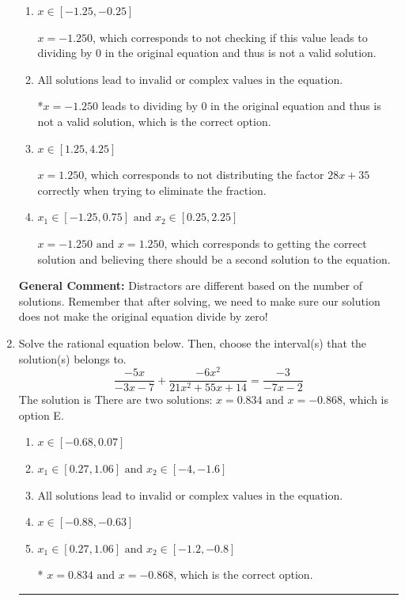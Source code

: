 \documentclass{extbook}[14pt]
\newcommand{\litem}[1]{\item #1

\rule{\textwidth}{0.4pt}}
\begin{document}
\begin{enumerate}
{\begin{enumerate}[label=\Alph*.]
$x = -1.250 \text{ and } x = -1.250$, which corresponds to getting the correct solution and believing there should be a second solution to the equation.
\item \( x \in [-1.25,-0.25] \)

$x = -1.250$, which corresponds to not checking if this value leads to dividing by 0 in the original equation and thus is not a valid solution.
\item \( \text{All solutions lead to invalid or complex values in the equation.} \)

*$x = -1.250$ leads to dividing by 0 in the original equation and thus is not a valid solution, which is the correct option.
\item \( x \in [1.25,4.25] \)

$x = 1.250$, which corresponds to not distributing the factor $28x + 35$ correctly when trying to eliminate the fraction.
\item \( x_1 \in [-1.25, 0.75] \text{ and } x_2 \in [0.25,2.25] \)

$x = -1.250 \text{ and } x = 1.250$, which corresponds to getting the correct solution and believing there should be a second solution to the equation.
\end{enumerate}

\textbf{General Comment:} Distractors are different based on the number of solutions. Remember that after solving, we need to make sure our solution does not make the original equation divide by zero!
}
\litem{
Solve the rational equation below. Then, choose the interval(s) that the solution(s) belongs to.
\[ \frac{-5x}{-3x -7} + \frac{-6x^{2}}{21x^{2} +55 x + 14} = \frac{-3}{-7x -2} \]The solution is \( \text{There are two solutions: } x = 0.834 \text{ and } x = -0.868 \), which is option E.\begin{enumerate}[label=\Alph*.]
\item \( x \in [-0.68,0.07] \)


\item \( x_1 \in [0.27, 1.06] \text{ and } x_2 \in [-4,-1.6] \)


\item \( \text{All solutions lead to invalid or complex values in the equation.} \)


\item \( x \in [-0.88,-0.63] \)


\item \( x_1 \in [0.27, 1.06] \text{ and } x_2 \in [-1.2,-0.8] \)

* $x = 0.834 \text{ and } x = -0.868$, which is the correct option.
\end{enumerate}

}
\end{enumerate}
\end{document}
